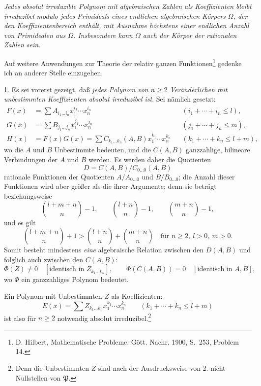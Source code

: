 \emph{Jedes absolut irreduzible Polynom mit algebraischen Zahlen als Koeffizienten bleibt irreduzibel modulo jedes Primideals eines endlichen algebraischen Körpers $\Omega$, der den Koeffizientenbereich enthält, mit Ausnahme höchstens einer endlichen Anzahl von Primidealen aus $\Omega$. Insbesondere kann $\Omega$ auch der Körper der rationalen Zahlen sein.}

Auf weitere Anwendungen zur Theorie der relativ ganzen Funktionen\footnote{D. Hilbert, Mathematische Probleme. Gött. Nachr. 1900, S.~253, Problem 14.} gedenke ich an anderer Stelle einzugehen.

1. Es sei vorerst gezeigt, daß \emph{jedes Polynom von $n\ge2$ Veränderlichen mit unbestimmten Koeffizienten absolut irreduzibel ist}. Sei nämlich gesetzt:
\begin{equation}
\begin{aligned}
F(x)&=\sum A_{i_1\ldots i_n}x_1^{i_1}\cdots x_n^{i_n} &&(i_1+\cdots+i_n\le l),\\
G(x)&=\sum B_{j_1\ldots j_n}x_1^{j_1}\cdots x_n^{j_n} &&(j_1+\cdots+j_n\le m),\\
H(x)&=F(x)G(x)=\sum C_{k_1\ldots k_n}(A,B)x_1^{k_1}\cdots x_n^{k_n} &&(k_1+\cdots+k_n\le l+m),
\end{aligned}
\tag{1}
\end{equation}
wo die $A$ und $B$ Unbestimmte bedeuten, und die $C(A,B)$ ganzzahlige, bilineare Verbindungen der $A$ und $B$ werden. Es werden daher die Quotienten
\[
D=C(A,B)/C_{0\ldots0}(A,B)
\]
rationale Funktionen der Quotienten $A/A_{0\ldots0}$ und $B/B_{0\ldots0}$; die Anzahl dieser Funktionen wird aber größer als die ihrer Argumente; denn sie beträgt beziehungsweise
\[
\binom{l+m+n}{n}-1,
\qquad
\binom{l+n}{n}-1,
\qquad
\binom{m+n}{n}-1,
\]
und es gilt
\[
\binom{l+m+n}{n}+1>
\binom{l+n}{n}+\binom{m+n}{n}
\quad\text{für } n\ge2,\ l>0,\ m>0.
\]
Somit besteht mindestens \emph{eine} algebraische Relation zwischen den $D(A,B)$ und folglich auch zwischen den $C(A,B)$:
\begin{equation}
 \Phi(Z)\ne0\quad[\text{identisch in }Z_{k_1\ldots k_n}],
 \qquad
 \Phi(C(A,B))=0\quad[\text{identisch in }A,B],
\tag{2}
\end{equation}
wo $\Phi$ ein ganzzahliges Polynom bedeutet.

Ein Polynom mit Unbestimmten $Z$ als Koeffizienten:
\begin{equation}
 E(x)=\sum Z_{k_1\ldots k_n}x_1^{k_1}\cdots x_n^{k_n}
 \qquad(k_1+\cdots+k_n\le l+m)
\tag{3}
\end{equation}
ist also für $n\ge2$ notwendig absolut irreduzibel.\footnote{Denn die Unbestimmten $Z$ sind nach der Ausdrucksweise von 2. nicht Nullstellen von $\mathfrak P$.}

